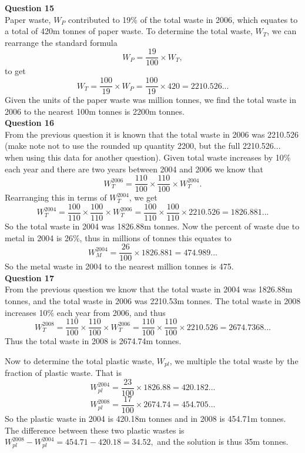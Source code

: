 \documentclass{article}
\begin{document}
\textbf{Question 15}\\
Paper waste, $W_P$ contributed to 19\% of the total waste in 2006, which equates to a total of 420m tonnes of paper waste. To determine the total waste, $W_{T}$, we can rearrange the standard formula
$$W_P= \frac{19}{100} \times W_T,$$
to get 
$$W_T= \frac{100}{19} \times W_P = \frac{100}{19} \times 420 = 2210.526...$$
Given the units of the paper waste was million tonnes, we find the total waste in 2006 to the nearest 100m tonnes is 2200m tonnes.\\

\textbf{Question 16} \\
From the previous question it is known that the total waste in 2006 was 2210.526 (make note not to use the rounded up quantity 2200, but the full 2210.526... when using this data for another question). Given total waste increases by 10\% each year and there are two years between 2004 and 2006 we know that 
$$W_T^{2006}=\frac{110}{100} \times \frac{110}{100} \times W_T^{2004}.$$
Rearranging this in terms of $W_T^{2004}$, we get
$$W_T^{2004}=\frac{100}{110} \times \frac{100}{110} \times W_T^{2006} =\frac{100}{110} \times \frac{100}{110} \times 2210.526 = 1826.881...$$
So the total waste in 2004 was 1826.88m tonnes.
Now the percent of waste due to metal in 2004 is 26\%, thus in millions of tonnes this equates to 
$$W_M^{2004}=\frac{26}{100} \times 1826.881 =474.989...$$
So the metal waste in 2004 to the nearest million tonnes is 475.\\

\textbf{Question 17} \\
From the previous question we know that the total waste in 2004 was 1826.88m tonnes, and the total waste in 2006 was 2210.53m tonnes. The total waste in 2008 increases 10\% each year from 2006, and thus
$$W_T^{2008}=\frac{110}{100} \times \frac{110}{100} \times W_T^{2006} = \frac{110}{100} \times \frac{110}{100} \times 2210.526 = 2674.7368...$$
Thus the total waste in 2008 is 2674.74m tonnes.

Now to determine the total plastic waste, $W_{pl}$, we multiple the total waste by the fraction of plastic waste. That is
$$W_{pl}^{2004}=\frac{23}{100} \times 1826.88 = 420.182...$$
$$W_{pl}^{2008}=\frac{17}{100} \times 2674.74 = 454.705...$$
So the plastic waste in 2004 is 420.18m tonnes and in 2008 is 454.71m tonnes.
The difference between these two plastic wastes is
$W_{pl}^{2008}-W_{pl}^{2004}=454.71-420.18=34.52,$
and the solution is thus 35m tonnes.\\
\end{document}
